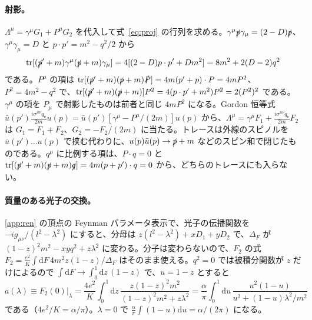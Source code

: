\documentclass[a4paper,10pt]{ltjsarticle}
\newcommand{\dd}{\mathrm{d}}
\begin{document}
\paragraph{射影。}$\Lambda^\mu=\gamma^\mu G_1+P^\mu G_2$ を代入して式~\eqref{eq:proj} の行列を求める。$\gamma^\mu\slashed p\gamma_\mu=(2-D)\slashed p$、$\gamma^\mu\gamma_\mu=D$ と $p\cdot p'=m^2-q^2/2$ から
\begin{equation*}
\mathrm{tr}[(\slashed p'+m)\gamma^\mu(\slashed p+m)\gamma_\mu]=4[(2-D)p\cdot p'+Dm^2]=8m^2+2(D-2)q^2
\end{equation*}
である。$P^\mu$ の項は $\mathrm{tr}[(\slashed p'+m)(\slashed p+m)\slashed P]=4m(p'+p)\cdot P=4mP^2$、$P^2=4m^2-q^2$ で、$\mathrm{tr}[(\slashed p'+m)(\slashed p+m)]P^2=4(p\cdot p'+m^2)P^2=2(P^2)^2$ である。$\gamma^\mu$ の項を $P_\mu$ で射影したものは前者と同じ $4mP^2$ になる。Gordon 恒等式 $\bar u(p')\frac{i\sigma^{\mu\nu}q_\nu}{2m}u(p)=\bar u(p')[\gamma^\mu-P^\mu/(2m)]u(p)$ から、$\Lambda^\mu=\gamma^\mu F_1+\frac{i\sigma^{\mu\nu}q_\nu}{2m}F_2$ は $G_1=F_1+F_2$、$G_2=-F_2/(2m)$ に当たる。トレースは外線のスピノルを $\bar u(p')\ldots u(p)$ で挟む代わりに、$u(p)\bar u(p)\to\slashed p+m$ などのスピン和で閉じたものである。$q^\mu$ に比例する項は、$P\cdot q=0$ と $\mathrm{tr}[(\slashed p'+m)(\slashed p+m)\slashed q]=4m(p+p')\cdot q=0$ から、どちらのトレースにも入らない。

\paragraph{質量のある光子の交換。}\ref{app:ren} の頂点の Feynman パラメータ表示で、光子の伝播関数を $-ig_{\mu\nu}/(l^2-\lambda^2)$ にすると、分母は $z(l^2-\lambda^2)+xD_1+yD_2$ で、$\Delta_F$ が $(1-z)^2m^2-xyq^2+z\lambda^2$ に変わる。分子は変わらないので、$F_2$ の式 $F_2=\frac{e^2}{K}\int\dd F\,4m^2z(1-z)/\Delta_F$ はそのまま使える。$q^2=0$ では被積分関数が $z$ だけによるので $\int\dd F\to\int_0^1\dd z\,(1-z)$ で、$u=1-z$ とすると
\begin{equation*}
a(\lambda)\equiv F_2(0)\big|_\lambda=\frac{4e^2}{K}\int_0^1\dd z\,\frac{z(1-z)^2m^2}{(1-z)^2m^2+z\lambda^2}
=\frac{\alpha}{\pi}\int_0^1\dd u\,\frac{u^2(1-u)}{u^2+(1-u)\lambda^2/m^2}
\end{equation*}
である（$4e^2/K=\alpha/\pi$）。$\lambda=0$ で $\frac{\alpha}{\pi}\int(1-u)\dd u=\alpha/(2\pi)$ になる。
\end{document}
